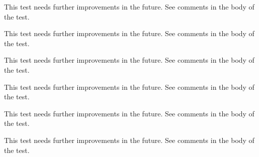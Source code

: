 \begin{DoxyRefList}
\item[Subprogram \mbox{\hyperlink{namespaceTest__System__mod_a733db17082cd5058dbc8d19e6f620909}{Test\+\_\+\+System\+\_\+mod\+::test\+\_\+execute\+Cmd\+\_\+2}} ()]\label{todo__todo000095}%
%
 This test needs further improvements in the future. See comments in the body of the test.  
\item[Subprogram \mbox{\hyperlink{namespaceTest__System__mod_a9a276bf5a7b9db66c140bd2202ebc7e9}{Test\+\_\+\+System\+\_\+mod\+::test\+\_\+get\+System\+Info\+\_\+1}} ()]\label{todo__todo000096}%
%
 This test needs further improvements in the future. See comments in the body of the test.  
\item[Subprogram \mbox{\hyperlink{namespaceTest__System__mod_aabfd080659733c4a852c62ccd400599b}{Test\+\_\+\+System\+\_\+mod\+::test\+\_\+\+OS\+\_\+type\+\_\+1}} ()]\label{todo__todo000090}%
%
 This test needs further improvements in the future. See comments in the body of the test.  
\item[Subprogram \mbox{\hyperlink{namespaceTest__System__mod_a86976d55b3a779d9a8c0064155e9cd4a}{Test\+\_\+\+System\+\_\+mod\+::test\+\_\+\+OS\+\_\+type\+\_\+2}} ()]\label{todo__todo000091}%
%
 This test needs further improvements in the future. See comments in the body of the test.  
\item[Subprogram \mbox{\hyperlink{namespaceTest__System__mod_ada729e6f3789a1df730ac21f58d5a334}{Test\+\_\+\+System\+\_\+mod\+::test\+\_\+\+OS\+\_\+type\+\_\+3}} ()]\label{todo__todo000092}%
%
 This test needs further improvements in the future. See comments in the body of the test.  
\item[Subprogram \mbox{\hyperlink{namespaceTest__System__mod_a6ba8a4348e2457b775dd061d40f33cb8}{Test\+\_\+\+System\+\_\+mod\+::test\+\_\+\+Sys\+Cmd\+\_\+type\+\_\+1}} ()]\label{todo__todo000093}%
%
 This test needs further improvements in the future. See comments in the body of the test. 
\end{DoxyRefList}